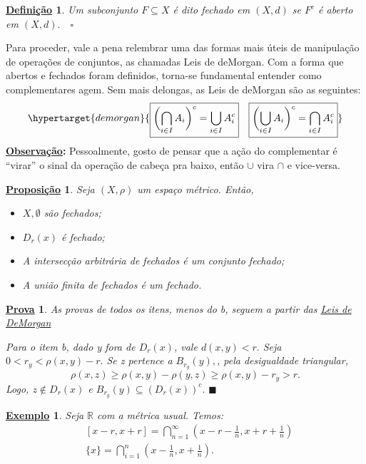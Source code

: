 \documentclass{article}
\newtheorem*{def*}{\underline{Defini\c c\~ao}}
\newtheorem*{prop*}{\underline{Proposi\c c\~ao}}
\newtheorem{example}{\underline{Exemplo}}
\newtheorem*{proof*}{\underline{Prova}}
\renewcommand\qedsymbol{$\blacksquare$}
\begin{document}
\begin{def*}
  Um subconjunto \(F\subseteq{X}\) é dito fechado em \((X, d)\) se \(F^{c}\) é aberto em \((X, d).\quad\square\)
\end{def*}
  Para proceder, vale a pena relembrar uma das formas mais úteis de manipulação de operações de conjuntos, as chamadas Leis de deMorgan. Com a forma que abertos e fechados foram definidos,
torna-se fundamental entender como complementares agem. Sem mais delongas, as Leis de deMorgan são as seguintes: 
  \[
    \hypertarget{demorgan}{\boxed{\biggl(\bigcap_{i\in I}^{}{A_{i}}\biggr)^{c} = \bigcup_{i\in I}^{}{A_{i}^{c}}}\quad\boxed{\biggl(\bigcup_{i\in I}^{}{A_{i}}\biggr)^{c} = \bigcap_{i\in I}^{}{A_{i}^{c}}}}
  \]
  \textbf{\underline{Observação}:} Pessoalmente, gosto de pensar que a ação do complementar é ``virar'' o sinal da operação de cabeça pra baixo, então \(\cup\) vira \(\cap\) e vice-versa.
\begin{prop*}
  Seja \((X, \rho )\) um espaço métrico. Então, 
 \begin{itemize}
   \item[a)] \(X, \emptyset\) são fechados;
   \item[b)] \(D_{r}(x)\) é fechado;
   \item[c)] A intersecção arbitrária de fechados é um conjunto fechado;
   \item[d)] A união finita de fechados é um fechado.
 \end{itemize}
\end{prop*}
\begin{proof*}
  As provas de todos os itens, menos do b, seguem a partir das \hyperlink{demorgan}{Leis de DeMorgan}

  Para o item b, dado y fora de \(D_{r}(x)\), vale \(d(x, y) < r.\) Seja \(0 < r_{y} < \rho (x, y) - r.\) Se z pertence a \(B_{r_{y}}(y),\), pela desigualdade triangular, 
    \[
      \rho (x, z)\geq \rho (x, y) - \rho (y, z)\geq \rho (x, y) - r_{y} > r.
    \]
    Logo, \(z\not\in D_{r}(x)\) e \(B_{r_{y}}(y)\subseteq{(D_{r}(x))^{c}}.\) \qedsymbol
\end{proof*}
\begin{example}
  Seja \(\mathbb{R}\) com a métrica usual. Temos:
 \begin{align*}
   &[x-r, x+r]=\bigcap_{n=1}^{\infty}{(x-r-\frac{1}{n}, x+r+\frac{1}{n})}\\
   &\{x\} = \bigcap_{i=1}^{n}{(x-\frac{1}{n}, x+\frac{1}{n})}.
 \end{align*}
\end{example}
\newpage
\end{document}
